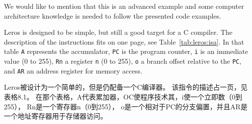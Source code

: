 \documentclass[%
    10pt,
    headinclude, footexclude,
    openright, %
    notitlepage,
    cleardoubleempty,
    headsepline,
    pointlessnumbers,
    bibtotoc, idxtotoc,
    ]{scrbook}
\newcommand{\code}[1]{{\small{\texttt{#1}}}}
\begin{document}
{We would like to mention that this is an advanced example and some computer
architecture knowledge is needed to follow the presented code examples.



Leros is designed to be simple, but still a good target for a C compiler.
The description of the instructions fits on one page, see Table~\ref{tab:leros:isa}.
In that table \code{A} represents the accumulator, \code{PC} is the program counter,
\code{i} is an immediate value (0 to 255), \code{Rn} a register
\code{n} (0 to 255), \code{o} a branch offset relative to the \code{PC},
and \code{AR} an address register for memory access.

Leros被设计为一个简单的，但是仍配备一个C编译器。
该指令的描述占一页，见表格8.1。
在那个表格，A代表累加器，OC使程序技术其，i使一个立即数（0到255）， Rn是一个寄存器n（0到255），
o是一个相对于PC的分支偏置，并且AR是一个地址寄存器用于存储器访问。


}
\end{document}
